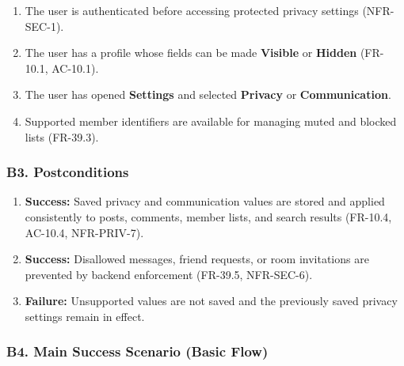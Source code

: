 \documentclass[12pt]{article}
\begin{document}
\begin{enumerate}
\item The user is authenticated before accessing protected privacy settings (NFR-SEC-1).
\item The user has a profile whose fields can be made \textbf{Visible} or \textbf{Hidden} (FR-10.1, AC-10.1).
\item The user has opened \textbf{Settings} and selected \textbf{Privacy} or \textbf{Communication}.
\item Supported member identifiers are available for managing muted and blocked lists (FR-39.3).
\end{enumerate}
\par\medskip

\hypertarget{sec:b3-postconditions}{}
\subsubsection*{B3. Postconditions}
\par\medskip

\begin{enumerate}
\item \textbf{Success:} Saved privacy and communication values are stored and applied consistently to posts, comments, member lists, and search results (FR-10.4, AC-10.4, NFR-PRIV-7).
\item \textbf{Success:} Disallowed messages, friend requests, or room invitations are prevented by backend enforcement (FR-39.5, NFR-SEC-6).
\item \textbf{Failure:} Unsupported values are not saved and the previously saved privacy settings remain in effect.
\end{enumerate}
\par\medskip

\hypertarget{sec:b4-main-success-scenario-basic-flow}{}
\subsubsection*{B4. Main Success Scenario (Basic Flow)}
\par\medskip
\end{document}
